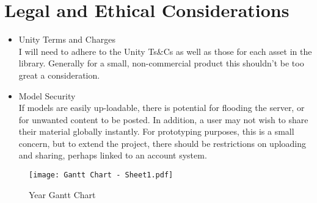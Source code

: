\documentclass{article}
\begin{document}
\section{Legal and Ethical Considerations}
\begin{itemize}
    \item Unity Terms and Charges \\
    I will need to adhere to the Unity Ts\&Cs as well as those for each asset in the library. Generally for a small, non-commercial product this shouldn't be too great a consideration. 
    \item Model Security \\
    If models are easily up-loadable, there is potential for flooding the server, or for unwanted content to be posted. In addition, a user may not wish to share their material globally instantly. For prototyping purposes, this is a small concern, but to extend the project, there should be restrictions on uploading and sharing, perhaps linked to an account system.
\end{itemize}

\begin{figure}
    \texttt{[image: Gantt Chart - Sheet1.pdf]}
        \caption{Year Gantt Chart}
        \label{fig:gantt}
\end{figure}

\newpage

\end{document}
